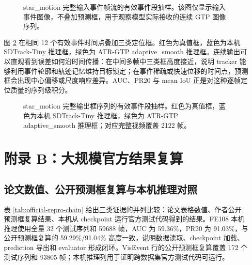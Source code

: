 \documentclass[UTF8,a4paper,zihao=-4]{ctexart}
\begin{document}
\begin{figure}[H]
\centering
{}
\caption{star\_motion 完整输入事件帧流的有效事件段抽样。该图仅显示输入事件图像，不叠加预测框，用于观察模型实际接收的连续 GTP 图像序列。}
\label{fig:sequence-input-full}
\end{figure}

图 \ref{fig:sequence-output-full} 在相同 12 个有效事件时间点叠加三类定位框。红色为真值框，蓝色为本机 SDTrack-Tiny 推理框，绿色为 ATR-GTP adaptive\_smooth 推理框。连续输出可以直观看到误差如何沿时间传播：在中间多帧中三类框高度接近，说明 tracker 能够利用事件轮廓和轨迹记忆维持目标锁定；在事件稀疏或快速位移的时间点，预测框会出现中心偏移或尺度响应差异。AUC、PR20 与 mean IoU 正是对这种逐帧定位质量的序列级积分。

\begin{figure}[H]
\centering
{}
\caption{star\_motion 完整输出框序列的有效事件段抽样。红色为真值框，蓝色为本机 SDTrack-Tiny 推理框，绿色为 ATR-GTP adaptive\_smooth 推理框；对应完整视频覆盖 2122 帧。}
\label{fig:sequence-output-full}
\end{figure}

\section{附录 B：大规模官方结果复算}
\subsection{论文数值、公开预测框复算与本机推理对照}
表 \ref{tab:official-repro-chain} 给出三类证据的并列比较：论文表格数值、作者公开预测框复算结果、本机从 checkpoint 运行官方测试代码得到的结果。FE108 本机推理使用全量 32 个测试序列和 59688 帧，AUC 为 59.36\%，PR20 为 91.03\%，与公开预测框复算的 59.29\%/91.04\% 高度一致，说明数据读取、checkpoint 加载、prediction 导出和 evaluator 形成闭环。VisEvent 行的公开预测框复算覆盖 172 个测试序列和 93805 帧；本机推理列用于证明跨数据集官方测试代码可运行。

\begin{table}[H]
\centering
\small
\caption{论文数值、公开预测框复算与本机官方推理结果对照。}
\label{tab:official-repro-chain}
\resizebox{\linewidth}{!}{}
\end{table}
\end{document}

